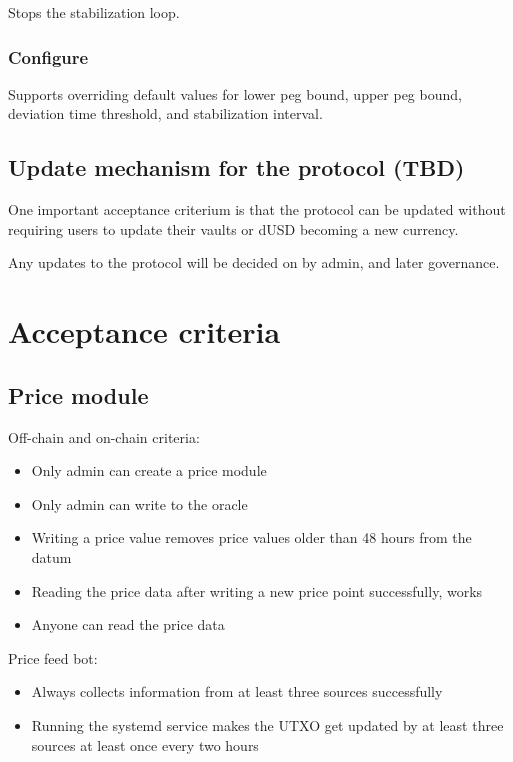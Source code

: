 \documentclass{article} %
\begin{document}
Stops the stabilization loop.

\subsubsection{Configure}

Supports overriding default values for lower peg bound, upper peg bound, deviation 
time threshold, and stabilization interval.

\subsection{Update mechanism for the protocol (TBD)}

One important acceptance criterium is that the protocol can be updated without
requiring users to update their vaults or dUSD becoming a new currency.

Any updates to the protocol will be decided on by admin, and later governance.

\section{Acceptance criteria}

\subsection{Price module}

Off-chain and on-chain criteria:
\begin{itemize}
  \item Only admin can create a price module
  \item Only admin can write to the oracle
  \item Writing a price value removes price values older than 48 hours from the
    datum
  \item Reading the price data after writing a new price point successfully,
    works
  \item Anyone can read the price data
\end{itemize}

Price feed bot:
\begin{itemize}
  \item Always collects information from at least three sources successfully
  \item Running the systemd service makes the UTXO get updated by at least three
    sources at least once every two hours
\end{itemize}
\end{document}
